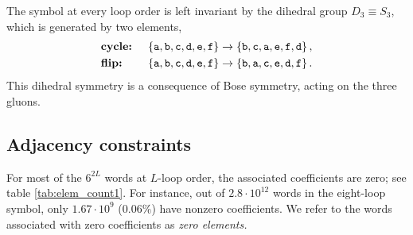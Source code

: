 \documentclass[12pt]{article}
\begin{document}
The symbol at every loop order is left invariant by the dihedral group $D_3 \equiv S_3$, which is generated by two elements,
%
\begin{equation}
   \begin{aligned}
&\text{\textbf{cycle:} } &&\{{\tt a}, {\tt b}, {\tt c}, {\tt d}, {\tt e}, {\tt f}\} \to \{{\tt b}, {\tt c}, {\tt a}, {\tt e}, {\tt f}, {\tt d}\}\,, \\
&\text{\textbf{flip:} } &&\{{\tt a}, {\tt b}, {\tt c}, {\tt d}, {\tt e}, {\tt f}\} \to \{{\tt b}, {\tt a}, {\tt c}, {\tt e}, {\tt d}, {\tt f}\} \,.
\end{aligned}
\label{dihedralsymm}
\end{equation}
%
This dihedral symmetry is a consequence of Bose symmetry, acting on the three gluons.

\subsection{Adjacency constraints}

For most of the $6^{2L}$ words at $L$-loop order, the associated coefficients are zero; see table \ref{tab:elem_count1}. For instance, out of $2.8\cdot 10^{12}$ words in the eight-loop symbol, only $1.67\cdot 10^9$ ($0.06\%$) have nonzero coefficients. We refer to the words associated with zero coefficients as \emph{zero elements.} 

\end{document}
